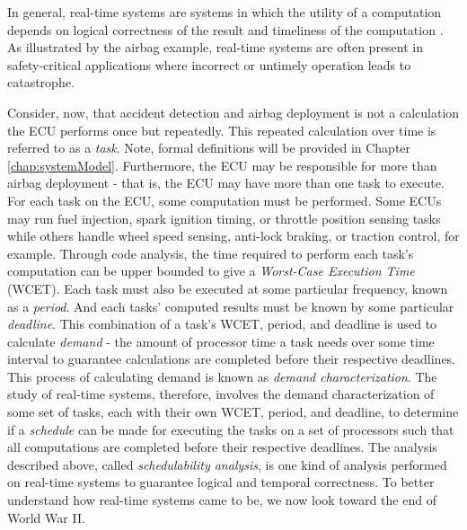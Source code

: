 In general, real-time systems are systems in which the utility of a computation depends on logical correctness of the result and timeliness of the computation \cite{buttazzo_hard_1997}.
As illustrated by the airbag example, real-time systems are often present in safety-critical applications where incorrect or untimely operation leads to catastrophe.

Consider, now, that accident detection and airbag deployment is not a calculation the ECU performs once but repeatedly.
This repeated calculation over time is referred to as a \textit{task}.
Note, formal definitions will be provided in Chapter \ref{chap:systemModel}.
Furthermore, the ECU may be responsible for more than airbag deployment - that is, the ECU may have more than one task to execute.
For each task on the ECU, some computation must be performed.
Some ECUs may run fuel injection, spark ignition timing, or throttle position sensing tasks while others handle wheel speed sensing, anti-lock braking, or traction control, for example.
Through code analysis, the time required to perform each task's computation can be upper bounded to give a \textit{Worst-Case Execution Time} (WCET).
Each task must also be executed at some particular frequency, known as a \textit{period}.
And each tasks' computed results must be known by some particular \textit{deadline}.
This combination of a task's WCET, period, and deadline is used to calculate \textit{demand} - the amount of processor time a task needs over some time interval to guarantee calculations are completed before their respective deadlines.
This process of calculating demand is known as \textit{demand characterization}.
The study of real-time systems, therefore, involves the demand characterization of some set of tasks, each with their own WCET, period, and deadline, to determine if a \textit{schedule} can be made for executing the tasks on a set of processors such that all computations are completed before their respective deadlines.
The analysis described above, called \textit{schedulability analysis}, is one kind of analysis performed on real-time systems to guarantee logical and temporal correctness.
To better understand how real-time systems came to be, we now look toward the end of World War II.


